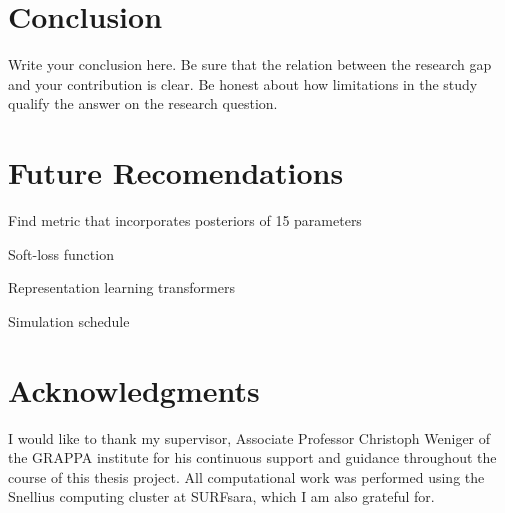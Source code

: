 \section{Conclusion}
\label{sec:conclusion}
Write your conclusion here. Be sure that the relation between the research gap and your contribution is clear. Be honest about how limitations in the study qualify the answer on the research question.



\section{Future Recomendations}
\label{sec:acknowledgments}

Find metric that incorporates posteriors of 15 parameters

Soft-loss function

Representation learning transformers

Simulation schedule

\section{Acknowledgments}
\label{sec:acknowledgments}

I would like to thank my supervisor, Associate Professor Christoph Weniger of the GRAPPA institute for his continuous support and guidance throughout the course of this thesis project. All computational work was performed using the Snellius computing cluster at SURFsara, which I am also grateful for.

\FloatBarrier